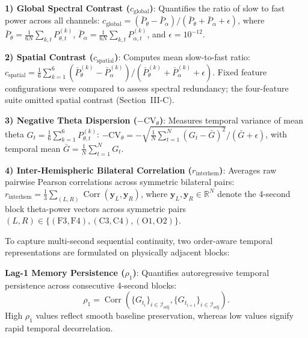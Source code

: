 \documentclass[journal,twoside,web]{ieeecolor}
\begin{document}
\textbf{1) Global Spectral Contrast ($c_{\text{global}}$)}: Quantifies the ratio of slow to fast power across all channels: $c_{\text{global}} = (\bar{P}_\theta - \bar{P}_\alpha)/(\bar{P}_\theta + \bar{P}_\alpha + \epsilon)$, where $\bar{P}_\theta = \frac{1}{6N}\sum_{k, t} P_{\theta, t}^{(k)}$, $\bar{P}_\alpha = \frac{1}{6N}\sum_{k, t} P_{\alpha, t}^{(k)}$, and $\epsilon = 10^{-12}$.

\textbf{2) Spatial Contrast ($c_{\text{spatial}}$)}: Computes mean slow-to-fast ratio: $c_{\text{spatial}} = \frac{1}{6}\sum_{k=1}^6 (\bar{P}_\theta^{(k)} - \bar{P}_\alpha^{(k)})/(\bar{P}_\theta^{(k)} + \bar{P}_\alpha^{(k)} + \epsilon)$. Fixed feature configurations were compared to assess spectral redundancy; the four-feature suite omitted spatial contrast (Section~III-C).

\textbf{3) Negative Theta Dispersion ($-\mathrm{CV}_\theta$)}: Measures temporal variance of mean theta $G_t = \frac{1}{6}\sum_{k=1}^6 P_{\theta, t}^{(k)}$: $-\mathrm{CV}_\theta = - \sqrt{\frac{1}{N}\sum_{t=1}^N (G_t - \bar{G})^2}/(\bar{G} + \epsilon)$, with temporal mean $\bar{G} = \frac{1}{N}\sum_{t=1}^N G_t$.

\vspace{2pt}
\textbf{4) Inter-Hemispheric Bilateral Correlation ($r_{\text{interhem}}$)}: Averages raw pairwise Pearson correlations across symmetric bilateral pairs: $r_{\text{interhem}} = \frac{1}{3}\sum_{(L, R)} \operatorname{Corr}(\mathbf{y}_L, \mathbf{y}_R)$, where $\mathbf{y}_L, \mathbf{y}_R \in \mathbb{R}^N$ denote the 4-second block theta-power vectors across symmetric pairs $(L, R) \in \{(\text{F3}, \text{F4}), (\text{C3}, \text{C4}), (\text{O1}, \text{O2})\}$.

To capture multi-second sequential continuity, two order-aware temporal representations are formulated on physically adjacent blocks:

\textbf{Lag-1 Memory Persistence ($\rho_1$)}: Quantifies autoregressive temporal persistence across consecutive 4-second blocks:
\begin{equation}
\rho_1 = \operatorname{Corr}(\{G_{t_i}\}_{i \in \mathcal{I}_{\text{adj}}}, \{G_{t_{i+1}}\}_{i \in \mathcal{I}_{\text{adj}}}).
\end{equation}
High $\rho_1$ values reflect smooth baseline preservation, whereas low values signify rapid temporal decorrelation.
\end{document}
